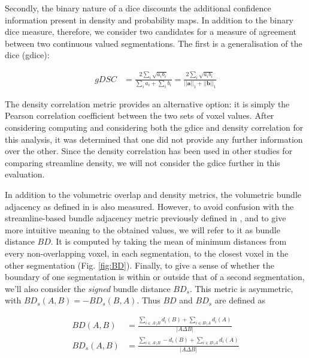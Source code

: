 Secondly, the binary nature of a \gls{dice} discounts the additional confidence information present in density and probability maps.
In addition to the binary \gls{dice} measure, therefore, we consider two candidates for a measure of agreement between two continuous valued segmentations.
The first is a generalisation of the \gls{dice} (\gls{gdice}):

\begin{align}
  gDSC &= \frac{2 \sum_i \sqrt{a_ib_i} }{\sum_ia_i + \sum_ib_i}
  =  \frac{2 \sum_i \sqrt{a_ib_i} }{||\mathbf{a}||_1 + ||\mathbf{b}||_1}
\end{align}

The density correlation metric provides an alternative option:
it is simply the Pearson correlation coefficient between the two sets of voxel values.
After considering computing and considering both the \gls{gdice} and density correlation for this analysis, it was determined that one did not provide any further information over the other.
Since the density correlation has been used in other studies for comparing streamline density,\autocite{Radwan2022, Schilling2021a} we will not consider the \gls{gdice} further in this evaluation.

In addition to the volumetric overlap and density metrics, the volumetric bundle adjacency as defined in \textcite{Schilling2021a} is also measured.
However, to avoid confusion with the streamline-based bundle adjacency\autocite{Radwan2022, Garyfallidis2012, Rheault2022} metric previously defined in \textcite{Garyfallidis2012},
and to give more intuitive meaning to the obtained values, we will refer to it as bundle distance $BD$.
It is computed by taking the mean of minimum distances from every non-overlapping voxel, in each segmentation, to the closest voxel in the other segmentation (Fig. \ref{fig:BD}).
Finally, to give a sense of whether the boundary of one segmentation is within or outside that of a second segmentation, we'll also consider the \textit{signed} bundle distance $BD_s$.
This metric is asymmetric, with $BD_s (A,B) = -BD_s(B,A)$.
Thus $BD$ and $BD_s$ are defined as

\begin{align}
  BD(A,B) &= \frac{\sum_{i \in A\setminus B} d_i(B) + \sum_{i \in B\setminus A} d_i(A)}{|A\Delta B|} \label{eq:bd} \\
  BD_s(A,B) &= \frac{\sum_{i \in A\setminus B} - d_i(B) + \sum_{i \in B\setminus A} d_i(A)}{|A\Delta B|} \label{eq:bds}
\end{align}


